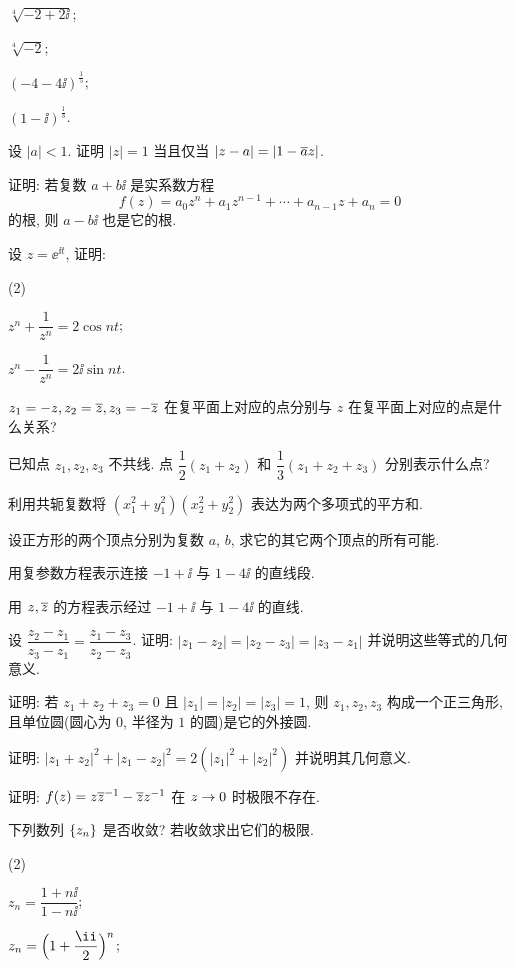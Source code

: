 \begin{homework}
\begin{homework}
\begin{subhomework}
      \item $\sqrt[4]{-2+2\ii}$;
      \item $\sqrt[4]{-2}$;
      \item $(-4-4\ii)^{\frac15}$;
      \item $(1-\ii)^{\frac13}$.
    \end{subhomework}
    \item 设 $|a|<1$. 证明 $|z|=1$ 当且仅当 $|z-a|=|1-\overline az|$.
    \item 证明: 若复数 $a+b\ii$ 是实系数方程
      \[
        f(z)=a_0z^n+a_1z^{n-1}+\cdots+a_{n-1}z+a_n=0
      \]
      的根, 则 $a-b\ii$ 也是它的根.
    \item 设 $z=\ee^{\ii t}$, 证明:
    \begin{subhomework}(2)
      \item $z^n+\dfrac1{z^n}=2\cos{nt}$;
      \item $z^n-\dfrac1{z^n}=2\ii\sin{nt}$.
    \end{subhomework}
    \item $z_1=-z,z_2=\overline z,z_3=-\overline{z}$ 在复平面上对应的点分别与 $z$ 在复平面上对应的点是什么关系?
    \item 已知点 $z_1,z_2,z_3$ 不共线. 点 $\dfrac12(z_1+z_2)$ 和 $\dfrac13(z_1+z_2+z_3)$ 分别表示什么点?
    \item 利用共轭复数将 $(x_1^2+y_1^2)(x_2^2+y_2^2)$ 表达为两个多项式的平方和.
    \item 设正方形的两个顶点分别为复数 $a$, $b$, 求它的其它两个顶点的所有可能.
    \item 用复参数方程表示连接 $-1+\ii$ 与 $1-4\ii$ 的直线段.
    \item 用 $z,\overline z$ 的方程表示经过 $-1+\ii$ 与 $1-4\ii$ 的直线.
    \item 设 $\dfrac{z_2-z_1}{z_3-z_1}=\dfrac{z_1-z_3}{z_2-z_3}$. 证明: $|z_1-z_2|=|z_2-z_3|=|z_3-z_1|$ 并说明这些等式的几何意义.
    \item 证明: 若 $z_1+z_2+z_3=0$ 且 $|z_1|=|z_2|=|z_3|=1$, 则 $z_1,z_2,z_3$ 构成一个正三角形, 且单位圆(圆心为 $0$, 半径为 $1$ 的圆)是它的外接圆.
    \item 证明: $|z_1+z_2|^2+|z_1-z_2|^2=2(|z_1|^2+|z_2|^2)$ 并说明其几何意义.
    \item 证明: $f(z)=z{\overline z}^{-1}-\overline zz^{-1}$ 在 $z\rightarrow 0$ 时极限不存在.
    \item 下列数列 ${\left\{z_n\right\}}$ 是否收敛? 若收敛求出它们的极限.
    \begin{subhomework}(2)
      \item $z_n=\dfrac{1+n\ii}{1-n\ii}$;
      \item $z_n=\Bigl(1+\dfrac \ii2\Bigr)^n$;

\end{subhomework}
\end{homework}
\end{homework}
